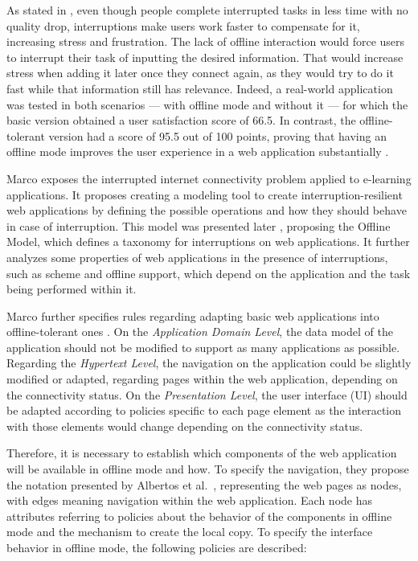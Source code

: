 As stated in \cite{Mark2008}, even though people complete interrupted tasks in less time with no quality drop, interruptions make users work faster to compensate for it, increasing stress and frustration. The lack of offline interaction would force users to interrupt their task of inputting the desired information. That would increase stress when adding it later once they connect again, as they would try to do it fast while that information still has relevance. Indeed, a real-world application was tested in both scenarios --- with offline mode and without it --- for which the basic version obtained a user satisfaction score of 66.5. In contrast, the offline-tolerant version had a score of 95.5 out of 100 points, proving that having an offline mode improves the user experience in a web application substantially \cite{Marco2015}. 

Marco \cite{Marco2013} exposes the interrupted internet connectivity problem applied to e-learning applications. It proposes creating a modeling tool to create interruption-resilient web applications by defining the possible operations and how they should behave in case of interruption. This model was presented later \cite{Abertos-Marco2017}, proposing the Offline Model, which defines a taxonomy for interruptions on web applications. It further analyzes some properties of web applications in the presence of interruptions, such as scheme and offline support, which depend on the application and the task being performed within it.

Marco further specifies rules regarding adapting basic web applications into offline-tolerant ones \cite{Marco2015}. On the \textit{Application Domain Level}, the data model of the application should not be modified to support as many applications as possible. Regarding the \textit{Hypertext Level}, the navigation on the application could be slightly modified or adapted, regarding pages within the web application, depending on the connectivity status. On the \textit{Presentation Level}, the user interface (UI) should be adapted according to policies specific to each page element as the interaction with those elements would change depending on the connectivity status.

Therefore, it is necessary to establish which components of the web application will be available in offline mode and how.
To specify the navigation, they propose the notation presented by Albertos et al.\ \cite{Penichet2013}, representing the web pages as nodes, with edges meaning navigation within the web application. Each node has attributes referring to policies about the behavior of the components in offline mode and the mechanism to create the local copy. To specify the interface behavior in offline mode, the following policies are described:

